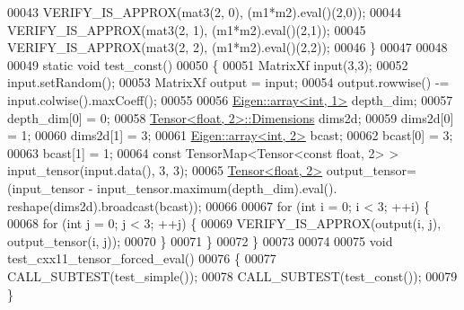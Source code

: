 \begin{DoxyCode}
00043   VERIFY\_IS\_APPROX(mat3(2, 0), (m1*m2).eval()(2,0));
00044   VERIFY\_IS\_APPROX(mat3(2, 1), (m1*m2).eval()(2,1));
00045   VERIFY\_IS\_APPROX(mat3(2, 2), (m1*m2).eval()(2,2));
00046 \}
00047 
00048 
00049 \textcolor{keyword}{static} \textcolor{keywordtype}{void} test\_const()
00050 \{
00051   MatrixXf input(3,3);
00052   input.setRandom();
00053   MatrixXf output = input;
00054   output.rowwise() -= input.colwise().maxCoeff();
00055 
00056   \hyperlink{class_eigen_1_1array}{Eigen::array<int, 1>} depth\_dim;
00057   depth\_dim[0] = 0;
00058   \hyperlink{class_eigen_1_1_tensor}{Tensor<float, 2>::Dimensions} dims2d;
00059   dims2d[0] = 1;
00060   dims2d[1] = 3;
00061   \hyperlink{class_eigen_1_1array}{Eigen::array<int, 2>} bcast;
00062   bcast[0] = 3;
00063   bcast[1] = 1;
00064   \textcolor{keyword}{const} TensorMap<Tensor<const float, 2> > input\_tensor(input.data(), 3, 3);
00065   \hyperlink{class_eigen_1_1_tensor}{Tensor<float, 2>} output\_tensor= (input\_tensor - input\_tensor.maximum(depth\_dim).eval().
      reshape(dims2d).broadcast(bcast));
00066 
00067   \textcolor{keywordflow}{for} (\textcolor{keywordtype}{int} i = 0; i < 3; ++i) \{
00068     \textcolor{keywordflow}{for} (\textcolor{keywordtype}{int} j = 0; j < 3; ++j) \{
00069       VERIFY\_IS\_APPROX(output(i, j), output\_tensor(i, j));
00070     \}
00071   \}
00072 \}
00073 
00074 
00075 \textcolor{keywordtype}{void} test\_cxx11\_tensor\_forced\_eval()
00076 \{
00077   CALL\_SUBTEST(test\_simple());
00078   CALL\_SUBTEST(test\_const());
00079 \}
\end{DoxyCode}
